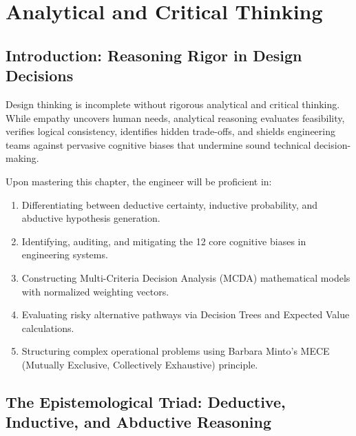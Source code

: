 \chapter{Analytical and Critical Thinking}
\label{chap:analytical-thinking}

\section{Introduction: Reasoning Rigor in Design Decisions}
Design thinking is incomplete without rigorous analytical and critical thinking. While empathy uncovers human needs, analytical reasoning evaluates feasibility, verifies logical consistency, identifies hidden trade-offs, and shields engineering teams against pervasive cognitive biases that undermine sound technical decision-making.

\begin{important}
Upon mastering this chapter, the engineer will be proficient in:
\begin{enumerate}[leftmargin=1.5em]
    \item Differentiating between deductive certainty, inductive probability, and abductive hypothesis generation.
    \item Identifying, auditing, and mitigating the 12 core cognitive biases in engineering systems.
    \item Constructing Multi-Criteria Decision Analysis (MCDA) mathematical models with normalized weighting vectors.
    \item Evaluating risky alternative pathways via Decision Trees and Expected Value calculations.
    \item Structuring complex operational problems using Barbara Minto's MECE (Mutually Exclusive, Collectively Exhaustive) principle.
\end{enumerate}
\end{important}

\section{The Epistemological Triad: Deductive, Inductive, and Abductive Reasoning}

